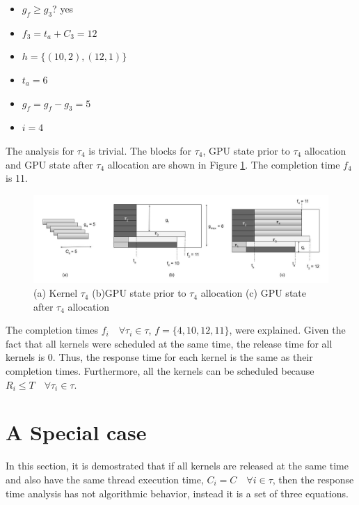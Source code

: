 \documentclass[
  12pt,
  a4paperpaper,
]{report}
\providecommand{\tightlist}{%
  \setlength{\itemsep}{0pt}\setlength{\parskip}{0pt}}
\begin{document}
\begin{itemize}
\tightlist
\item
  \(g_f \geq g_3\)? yes
\item
  \(f_3 = t_a + C_3 = 12\)
\item
  \(h = \{ (10,2),(12,1) \}\)
\item
  \(t_a = 6\)
\item
  \(g_f = g_f - g_3 = 5\)
\item
  \(i = 4\)
\end{itemize}

The analysis for \(\tau_4\) is trivial. The blocks for \(\tau_4\), GPU state prior to \(\tau_4\) allocation and GPU state after \(\tau_4\) allocation are shown in Figure \ref{img:ex_4}. 
The completion time \(f_4\) is 11.

\begin{figure}
\centering
\includegraphics{source/figures/ex_4.jpg}
\caption{(a) Kernel \(\tau_4\) (b)GPU state prior to \(\tau_4\)
allocation (c) GPU state after \(\tau_4\) allocation \label{img:ex_4}}
\end{figure}

The completion times \(f_i \quad \forall \tau_i \in \tau\), \(f = \{4,10,12,11\}\), were explained.
Given the fact that all kernels were scheduled at the same time, the release time for
all kernels is 0. Thus, the response time for each kernel is the same as
their completion times. 
Furthermore,  all the kernels can be scheduled because \(R_i \leq T \quad \forall \tau_i \in \tau\).

\hypertarget{a-special-case}{%
\section{A Special case}\label{a-special-case}}

In this section, it is demostrated  that if all kernels are released at the
same time and also have the same thread execution time,
\(C_i = C \quad \forall i \in \tau\), then the response time analysis has not
algorithmic behavior, instead it is a set of three equations.
\end{document}
